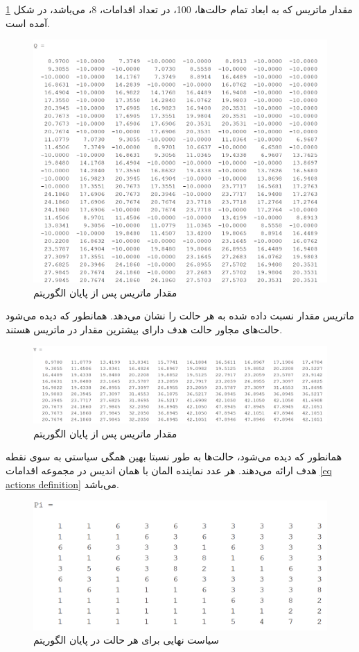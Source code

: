 مقدار ماتریس  که به ابعاد تمام حالت‌ها، 100، در تعداد اقدامات، 8، می‌باشد، در شکل \ref{Fig:example_Q} آمده است.
\begin{figure}[!h]
	\centering
	\includegraphics[scale=0.3]{Images/example-Q.png}
	\caption{مقدار ماتریس  پس از پایان الگوریتم }\label{Fig:example_Q}
\end{figure}

ماتریس  مقدار نسبت داده شده به هر حالت را نشان می‌دهد. همانطور که دیده می‌شود حالت‌های مجاور حالت هدف دارای بیشترین مقدار در ماتریس  هستند.
\begin{figure}[!h]
	\centering
	\includegraphics[scale=0.3]{Images/example-v.png}
	\caption{مقدار ماتریس  پس از پایان الگوریتم }
\end{figure}

همانطور که دیده می‌شود، حالت‌ها به طور نسبتا بهین همگی سیاستی به سوی نقطه هدف ارائه می‌دهند. هر عدد نماینده المان با همان اندیس در مجموعه اقدامات \ref{eq actions definition} می‌باشد.
\begin{figure}[!h]
	\centering
	\includegraphics[scale=0.4]{Images/example-pi.png}
	\caption{‌سیاست‌ نهایی برای هر حالت در پایان الگوریتم }
\end{figure}

